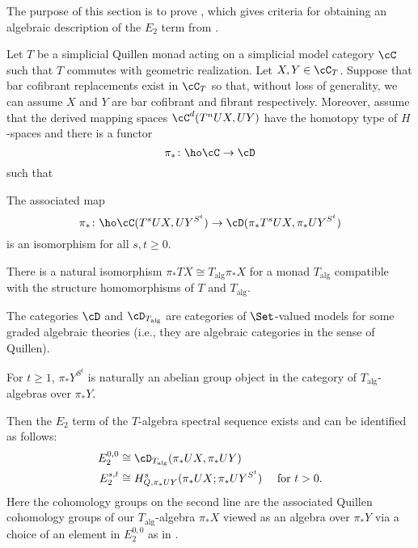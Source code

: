\documentclass[leqno,oneside,english]{elsarticle}
\begin{document}
The purpose of this section is to prove , which
gives criteria for obtaining an algebraic description of the $E_2$ term from
. 

\begin{thmB}
Let $T$ be a simplicial Quillen monad acting on a simplicial model category $\cC$ such that $T$ commutes with geometric realization. Let $X,Y\in \cC_T$. Suppose that bar cofibrant replacements exist in $\cC_T$ so that, without loss of generality, we can assume $X$ and $Y$ are bar cofibrant and fibrant respectively. Moreover, assume that the derived mapping spaces $\cC^d(T^{n}UX, UY)$ have the homotopy type of $H$-spaces and there is a functor
\[ 
\pi_*\colon \ho\cC\rightarrow \cD 
\] 
such that 
\begin{hypothenumerate}
  \item \label{item:universal-coefficient} The associated map 
  \[ 
  \pi_*\colon \ho \cC(T^{s}UX,UY^{S^t}) \to 
  \cD(\pi_* T^{s}UX,\pi_*UY^{S^t}) 
  \] 
  is an isomorphism for all $s,t\geq 0$.

  \item \label{item:algebraic-description} There is a natural
  isomorphism $\pi_*TX\cong T_{\mathrm{alg}}\pi_*X$ for a monad $T_{\mathrm{alg}}$
  compatible with the structure homomorphisms of $T$ and $T_{\mathrm{alg}}$.

  \item \label{item:theories} The categories $\cD$ and
  $\cD_{T_{\mathrm{alg}}}$ are categories of $\Set$-valued models for some graded
  algebraic theories (i.e., they are algebraic categories in the sense of
  Quillen).

  \item \label{item:abelian-groups} For $t\geq 1$, $\pi_*Y^{S^t}$ is
   naturally an abelian group object in the category of
   $T_{\mathrm{alg}}$-algebras over $\pi_* Y$. 
\end{hypothenumerate}
Then the $E_2$ term of the $T$-algebra spectral sequence 
exists and can be identified as follows:
\begin{align*}
  E_2^{0,0} &\cong \cD_{T_{\mathrm{alg}}}(\pi_* UX, \pi_* UY)\\
  E_2^{s,t} &\cong H^{s}_{Q, \pi_* UY}(\pi_*UX;\pi_*UY^{S^t}) \quad
  \text{ for }t> 0.
\end{align*}
Here the cohomology groups on
the second line are the associated Quillen cohomology groups of our
$T_{\mathrm{alg}}$-algebra $\pi_* X$ viewed as an algebra over $\pi_* Y$
via a choice of an element in $E_2^{0,0}$ as in
.

\end{thmB}
\end{document}
